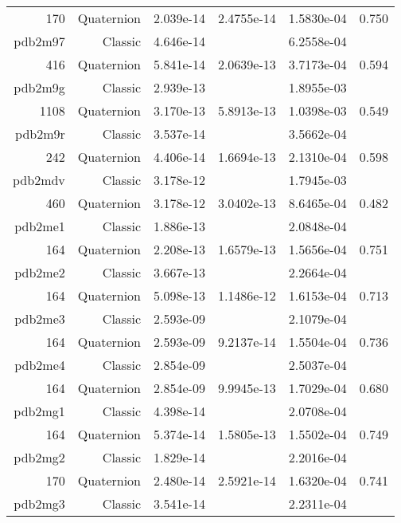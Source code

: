 \begin{xltabular}{\textwidth}{r|rS[table-format=1.3e+2]S[table-format=1.4e+2]S[table-format=1.4e+2]S[table-format=-1.3]}
170 & Quaternion & 2.039e-14 & 2.4755e-14 & 1.5830e-04 & 0.750\\  \addlinespace
{\color{red} pdb2m97 } & Classic & 4.646e-14 &  & 6.2558e-04 & \\
416 & Quaternion & 5.841e-14 & 2.0639e-13 & 3.7173e-04 & 0.594\\  \addlinespace
{\color{red} pdb2m9g } & Classic & 2.939e-13 &  & 1.8955e-03 & \\
1108 & Quaternion & 3.170e-13 & 5.8913e-13 & 1.0398e-03 & 0.549\\  \addlinespace
{\color{red} pdb2m9r } & Classic & 3.537e-14 &  & 3.5662e-04 & \\
242 & Quaternion & 4.406e-14 & 1.6694e-13 & 2.1310e-04 & 0.598\\  \addlinespace
{\color{red} pdb2mdv } & Classic & 3.178e-12 &  & 1.7945e-03 & \\
460 & Quaternion & 3.178e-12 & 3.0402e-13 & 8.6465e-04 & 0.482\\  \addlinespace
{\color{red} pdb2me1 } & Classic & 1.886e-13 &  & 2.0848e-04 & \\
164 & Quaternion & 2.208e-13 & 1.6579e-13 & 1.5656e-04 & 0.751\\  \addlinespace
{\color{red} pdb2me2 } & Classic & 3.667e-13 &  & 2.2664e-04 & \\
164 & Quaternion & 5.098e-13 & 1.1486e-12 & 1.6153e-04 & 0.713\\  \addlinespace
{\color{red} pdb2me3 } & Classic & 2.593e-09 &  & 2.1079e-04 & \\
164 & Quaternion & 2.593e-09 & 9.2137e-14 & 1.5504e-04 & 0.736\\  \addlinespace
{\color{red} pdb2me4 } & Classic & 2.854e-09 &  & 2.5037e-04 & \\
164 & Quaternion & 2.854e-09 & 9.9945e-13 & 1.7029e-04 & 0.680\\  \addlinespace
{\color{red} pdb2mg1 } & Classic & 4.398e-14 &  & 2.0708e-04 & \\
164 & Quaternion & 5.374e-14 & 1.5805e-13 & 1.5502e-04 & 0.749\\  \addlinespace
{\color{red} pdb2mg2 } & Classic & 1.829e-14 &  & 2.2016e-04 & \\
170 & Quaternion & 2.480e-14 & 2.5921e-14 & 1.6320e-04 & 0.741\\  \addlinespace
{\color{red} pdb2mg3 } & Classic & 3.541e-14 &  & 2.2311e-04 & \\

\end{xltabular}
